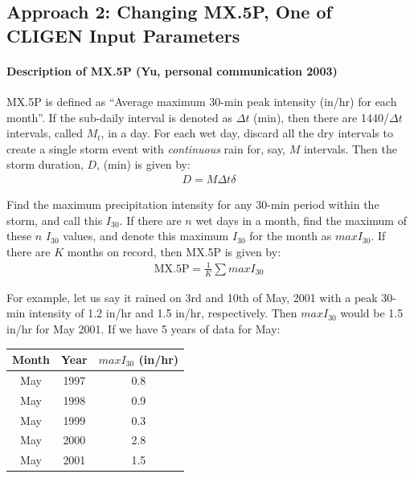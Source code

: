 \subsection{Approach 2: Changing {MX.5P}, One of CLIGEN Input
Parameters}
\label{sec:MethodTwo}

\paragraph{Description of {MX.5P} (Yu, personal communication 2003)}
\label{sec:MX5PByBYu}

{MX.5P} is defined as ``Average maximum 30-min peak intensity (in/hr) for each
month''. If the sub-daily interval is denoted as $\Delta t$ (min), then there
are 1440/$\Delta t$ intervals, called $M_t$, in a day. For each wet day, discard
all the dry intervals to create a single storm event with \emph{continuous} rain
for, say, $M$ intervals. Then the storm duration, $D$, (min) is given by:
\begin{eqnarray}
  D = M \Delta t \delta
\end{eqnarray}

Find the maximum precipitation intensity for any 30-min period within the storm,
and call this $I_{30}$. If there are $n$ wet days in a month, find the maximum
of these $n$ $I_{30}$ values, and denote this maximum $I_{30}$ for the month as
$maxI_{30}$. If there are $K$ months on record, then {MX.5P} is given by:
\begin{eqnarray}
  \mathrm{MX.5P} = \frac{1}{K} \sum maxI_{30}
\end{eqnarray}

For example, let us say it rained on 3rd and 10th of May, 2001 with a peak
30-min intensity of 1.2 in/hr and 1.5 in/hr, respectively. Then $maxI_{30}$
would be 1.5 in/hr for May 2001. If we have 5 years of data for May:

\begin{table}[hbpt]
  \centering
  \begin{tabular}{ccc}
    \toprule
    Month & Year & $maxI_{30}$ (in/hr)\\
    \midrule
    May & 1997 & 0.8\\
    May & 1998 & 0.9\\
    May & 1999 & 0.3\\
    May & 2000 & 2.8\\
    May & 2001 & 1.5\\
    \bottomrule
  \end{tabular}
\end{table}

